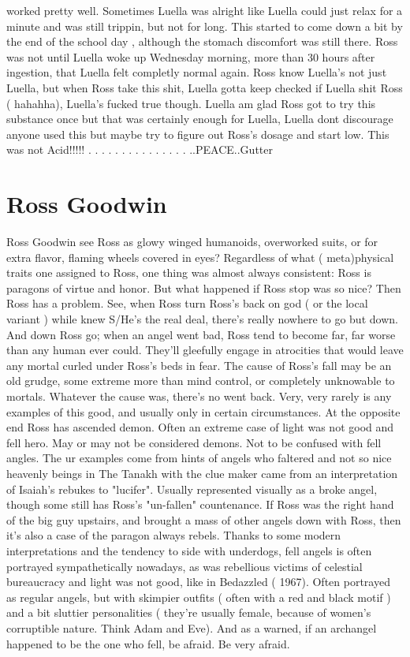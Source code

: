\documentclass[12pt]{book}
\begin{document}
worked pretty well. Sometimes Luella was alright like Luella could just relax for a minute and was still trippin, but not for long. This started to come down a bit by the end of the school day , although the stomach discomfort was still there. Ross was not until Luella woke up Wednesday morning, more than 30 hours after ingestion, that Luella felt completly normal again. Ross know Luella's not just Luella, but when Ross take this shit, Luella gotta keep checked if Luella shit Ross ( hahahha), Luella's fucked true though. Luella am glad Ross got to try this substance once but that was certainly enough for Luella, Luella dont discourage anyone used this but maybe try to figure out Ross's dosage and start low. This was not Acid!!!!! . . .   . . .   . . .   . . .   . . .  ..PEACE..Gutter



\chapter{Ross Goodwin}

Ross Goodwin see Ross as glowy winged humanoids, overworked suits, or for extra flavor, flaming wheels covered in eyes? Regardless of what ( meta)physical traits one assigned to Ross, one thing was almost always consistent: Ross is paragons of virtue and honor. But what happened if Ross stop was so nice? Then Ross has a problem. See, when Ross turn Ross's back on god ( or the local variant ) while knew S/He's the real deal, there's really nowhere to go but down. And down Ross go; when an angel went bad, Ross tend to become far, far worse than any human ever could. They'll gleefully engage in atrocities that would leave any mortal curled under Ross's beds in fear. The cause of Ross's fall may be an old grudge, some extreme more than mind control, or completely unknowable to mortals. Whatever the cause was, there's no went back. Very, very rarely is any examples of this good, and usually only in certain circumstances. At the opposite end Ross has ascended demon. Often an extreme case of light was not good and fell hero. May or may not be considered demons. Not to be confused with fell angles. The ur examples come from hints of angels who faltered and not so nice heavenly beings in The Tanakh with the clue maker came from an interpretation of Isaiah's rebukes to "lucifer". Usually represented visually as a broke angel, though some still has Ross's "un-fallen" countenance. If Ross was the right hand of the big guy upstairs, and brought a mass of other angels down with Ross, then it's also a case of the paragon always rebels. Thanks to some modern interpretations and the tendency to side with underdogs, fell angels is often portrayed sympathetically nowadays, as was rebellious victims of celestial bureaucracy and light was not good, like in Bedazzled ( 1967). Often portrayed as regular angels, but with skimpier outfits ( often with a red and black motif ) and a bit sluttier personalities ( they're usually female, because of women's corruptible nature. Think Adam and Eve). And as a warned, if an archangel happened to be the one who fell, be afraid. Be very afraid.
\end{document}
